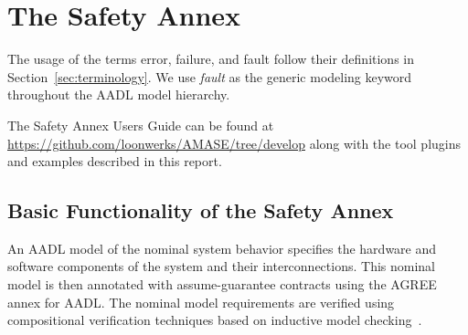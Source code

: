 \section{The Safety Annex}
\label{sec:safety_annex}

The usage of the terms error, failure, and fault follow their definitions in Section~\ref{sec:terminology}. We use {\em fault} as the generic modeling keyword throughout the AADL model hierarchy.

The Safety Annex Users Guide can be found at \url{https://github.com/loonwerks/AMASE/tree/develop} along with the tool plugins and examples described in this report. 




\subsection{Basic Functionality of the Safety Annex}

An AADL model of the nominal system behavior specifies the hardware and software components of the system and their interconnections. This nominal model is then annotated with assume-guarantee contracts using the AGREE annex for AADL. The nominal model requirements are verified using compositional verification techniques based on inductive model checking~\cite{2017arXiv171201222G}.

